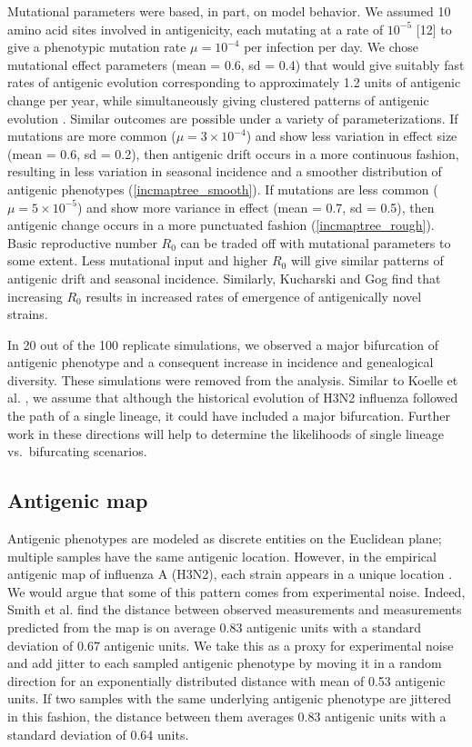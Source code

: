 Mutational parameters were based, in part, on model behavior.  We assumed 10 amino acid sites involved in antigenicity, each mutating at a rate of $10^{-5}$ 
[12]
to give a phenotypic mutation rate $\mu = 10^{-4}$ per infection per day.  We chose mutational effect parameters (mean = 0.6, sd = 0.4) that would give suitably fast rates of antigenic evolution corresponding to approximately 1.2 units of antigenic change per year, while simultaneously giving clustered patterns of antigenic evolution  \cite{Smith04}.  Similar outcomes are possible under a variety of parameterizations.  If mutations are more common ($\mu = 3 \times 10^{-4}$) and show less variation in effect size (mean = 0.6, sd = 0.2), then antigenic drift occurs in a more continuous fashion, resulting in less variation in seasonal incidence and a smoother distribution of antigenic phenotypes (\ref{incmaptree_smooth}).  If mutations are less common ($\mu = 5 \times 10^{-5}$) and show more variance in effect (mean = 0.7, sd = 0.5), then antigenic change occurs in a more punctuated fashion (\ref{incmaptree_rough}).  Basic reproductive number $R_0$ can be traded off with mutational parameters to some extent.  Less mutational input and higher $R_0$ will give similar patterns of antigenic drift and seasonal incidence.  Similarly, Kucharski and Gog  find that increasing $R_0$ results in increased rates of emergence of antigenically novel strains.

In 20 out of the 100 replicate simulations, we observed a major bifurcation of antigenic phenotype and a consequent increase in incidence and genealogical diversity.  These simulations were removed from the analysis.   Similar to Koelle et al. , we assume that although the historical evolution of H3N2 influenza followed the path of a single lineage, it could have included a major bifurcation.  Further work in these directions will help to determine the likelihoods of single lineage vs.\ bifurcating scenarios.

\subsection*{Antigenic map}

Antigenic phenotypes are modeled as discrete entities on the Euclidean plane; multiple samples have the same antigenic location.  However, in the empirical antigenic map of influenza A (H3N2), each strain appears in a unique location \cite{Smith04}.  We would argue that some of this pattern comes from experimental noise.  Indeed, Smith et al. \cite{Smith04} find the distance between observed measurements and measurements predicted from the map is on average 0.83 antigenic units with a standard deviation of 0.67 antigenic units.  We take this as a proxy for experimental noise and add jitter to each sampled antigenic phenotype by moving it in a random direction for an exponentially distributed distance with mean of 0.53 antigenic units.  If two samples with the same underlying antigenic phenotype are jittered in this fashion, the distance between them averages 0.83 antigenic units with a standard deviation of 0.64 units.


